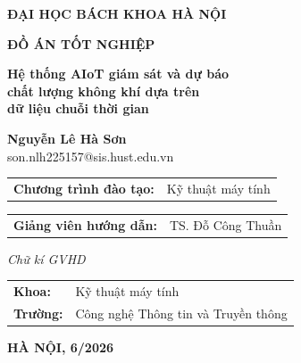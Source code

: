 \begin{titlepage}
\begin{center}

{\large\bfseries ĐẠI HỌC BÁCH KHOA HÀ NỘI}

\vspace{0.8cm}
{\Large\bfseries ĐỒ ÁN TỐT NGHIỆP}

\vspace{1.5cm}
{\LARGE\bfseries
Hệ thống AIoT giám sát và dự báo\\[6pt]
chất lượng không khí dựa trên\\[6pt]
dữ liệu chuỗi thời gian
}

\vspace{1.8cm}

{\large\bfseries Nguyễn Lê Hà Sơn}\\[4pt]
{\normalsize son.nlh225157@sis.hust.edu.vn}

\vspace{1.2cm}
\begin{tabular}{ll}
\textbf{Chương trình đào tạo:} & Kỹ thuật máy tính \\[4pt]
\end{tabular}

\vspace{0.8cm}
\begin{tabular}{ll}
\textbf{Giảng viên hướng dẫn:} & TS. Đỗ Công Thuần\\[4pt]
\end{tabular}

\vspace{0.5cm}
\begin{flushright}
\begin{minipage}{5cm}
\centering
\textit{Chữ kí GVHD}\\[2.5cm]
\end{minipage}
\end{flushright}

\vspace{0.3cm}
\begin{tabular}{ll}
\textbf{Khoa:} & Kỹ thuật máy tính \\[4pt]
\textbf{Trường:} & Công nghệ Thông tin và Truyền thông \\
\end{tabular}

\vfill
{\large\bfseries HÀ NỘI, 6/2026}

\end{center}
\end{titlepage}
